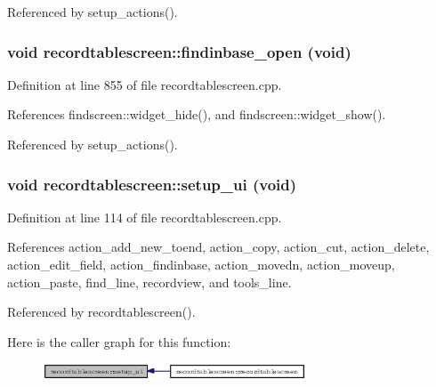 Referenced by setup\_\-actions().
\subsubsection{\setlength{\rightskip}{0pt plus 5cm}void recordtablescreen::findinbase\_\-open (void)\hspace{0.3cm}{\tt  [private, slot]}}\label{classrecordtablescreen_2b14a42da565396ee402c9cf1046c00c}




Definition at line 855 of file recordtablescreen.cpp.

References findscreen::widget\_\-hide(), and findscreen::widget\_\-show().

Referenced by setup\_\-actions().
\subsubsection{\setlength{\rightskip}{0pt plus 5cm}void recordtablescreen::setup\_\-ui (void)\hspace{0.3cm}{\tt  [private]}}\label{classrecordtablescreen_ce88d78bf51cbe1ebeb2515db80dece9}




Definition at line 114 of file recordtablescreen.cpp.

References action\_\-add\_\-new\_\-toend, action\_\-copy, action\_\-cut, action\_\-delete, action\_\-edit\_\-field, action\_\-findinbase, action\_\-movedn, action\_\-moveup, action\_\-paste, find\_\-line, recordview, and tools\_\-line.

Referenced by recordtablescreen().

Here is the caller graph for this function:\begin{figure}[H]
\begin{center}
\leavevmode
\includegraphics[width=222pt]{classrecordtablescreen_ce88d78bf51cbe1ebeb2515db80dece9_icgraph}
\end{center}
\end{figure}
